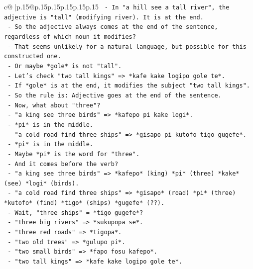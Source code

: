 \documentclass{article}
\begin{document}
{\begin{supertabular}{c@{$\;$}|p{.15\linewidth}@{}p{.15\linewidth}p{.15\linewidth}p{.15\linewidth}p{.15\linewidth}p{.15\linewidth}}
{{{\texttt{          {-} In "a hill see a tall river", the adjective is "tall" (modifying river). It is at the end.} \\
\texttt{          {-} So the adjective always comes at the end of the sentence, regardless of which noun it modifies?} \\
\texttt{          {-} That seems unlikely for a natural language, but possible for this constructed one.} \\
\texttt{          {-} Or maybe *gole* is not "tall".} \\
\texttt{          {-} Let's check "two tall kings" => *kafe kake logipo gole te*.} \\
\texttt{          {-} If *gole* is at the end, it modifies the subject "two tall kings".} \\
\texttt{          {-} So the rule is: Adjective goes at the end of the sentence.} \\
\texttt{          {-} Now, what about "three"?} \\
\texttt{          {-} "a king see three birds" => *kafepo pi kake logi*.} \\
\texttt{          {-} *pi* is in the middle.} \\
\texttt{          {-} "a cold road find three ships" => *gisapo pi kutofo tigo gugefe*.} \\
\texttt{          {-} *pi* is in the middle.} \\
\texttt{          {-} Maybe *pi* is the word for "three".} \\
\texttt{          {-} And it comes before the verb?} \\
\texttt{          {-} "a king see three birds" => *kafepo* (king) *pi* (three) *kake* (see) *logi* (birds).} \\
\texttt{          {-} "a cold road find three ships" => *gisapo* (road) *pi* (three) *kutofo* (find) *tigo* (ships) *gugefe* (??).} \\
\texttt{          {-} Wait, "three ships" = *tigo gugefe*?} \\
\texttt{          {-} "three big rivers" => *sukupopa se*.} \\
\texttt{          {-} "three red roads" => *tigopa*.} \\
\texttt{          {-} "two old trees" => *gulupo pi*.} \\
\texttt{          {-} "two small birds" => *fapo fosu kafepo*.} \\
\texttt{          {-} "two tall kings" => *kafe kake logipo gole te*.} \\
}}}
\end{supertabular}}
\end{document}
